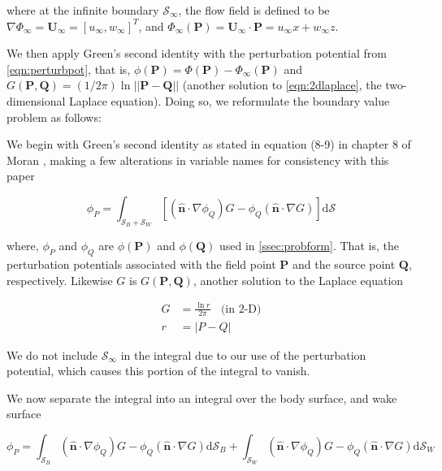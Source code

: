 	\noindent where at the infinite boundary \( \mathcal{S}_{\infty} \), the flow field is defined to be \( \nabla \Phi_{\infty} = \mathbf{U}_{\infty} = [u_{\infty}, w_{\infty}]^T\), and \( \Phi_{\infty}(\mathbf{P}) = \mathbf{U}_{\infty} \cdot \mathbf{P} = u_{\infty}x + w_{\infty}z\).
	
	
	We then apply Green's second identity with the perturbation potential from \cref{eqn:perturbpot}, that is, \( \phi(\mathbf{P}) = \Phi(\mathbf{P}) - \Phi_{\infty}(\mathbf{P}) \) and \( G(\mathbf{P},\mathbf{Q}) = (1/2\pi)\ln||\mathbf{P}-\mathbf{Q}|| \) (another solution to \cref{eqn:2dlaplace}, the two-dimensional Laplace equation). Doing so, we reformulate the boundary value problem as follows: 
	
	We begin with Green's second identity as stated in equation (8-9) in chapter 8 of Moran \cite{moran1984}, making a few alterations in variable names for consistency with this paper
	
	\begin{equation}
	\phi_P = \int_{\mathcal{S}_B + \mathcal{S}_W} \left[ \left( \mathbf{\hat{n}} \cdot \nabla \phi_Q \right) G - \phi_Q \left( \mathbf{\hat{n}} \cdot \nabla G \right) \right] \mathrm{d} \mathcal{S}
	\end{equation}
	
	\noindent where, \(\phi_P\) and \(\phi_Q\) are $\phi(\mathbf{P})$ and $\phi(\mathbf{Q})$ used in \cref{ssec:probform}. That is, the perturbation potentials associated with the field point $\mathbf{P}$ and the source point $\mathbf{Q}$, respectively. Likewise $G$ is $G(\mathbf{P},\mathbf{Q})$, another solution to the Laplace equation 
	
	\begin{align}
	G &= \frac{\ln{r}}{2\pi}~~~~\text{(in 2-D)}\\
	r &= |P-Q|
	\end{align}
	
	
	
	We do not include \(\mathcal{S}_{\infty}\) in the integral due to our use of the perturbation potential, which causes this portion of the integral to vanish.\cite{moran1984} 
	
	We now separate the integral into an integral over the body surface, and wake surface
	
	\begin{equation}
	\phi_P = \int_{\mathcal{S}_B} \left( \mathbf{\hat{n}} \cdot \nabla \phi_Q \right) G - \phi_Q \left( \mathbf{\hat{n}} \cdot \nabla G \right) \mathrm{d} \mathcal{S}_B + \int_{\mathcal{S}_W} \left( \mathbf{\hat{n}} \cdot \nabla \phi_Q \right) G - \phi_Q \left( \mathbf{\hat{n}} \cdot \nabla G \right) \mathrm{d} \mathcal{S}_W
	\end{equation}
	
